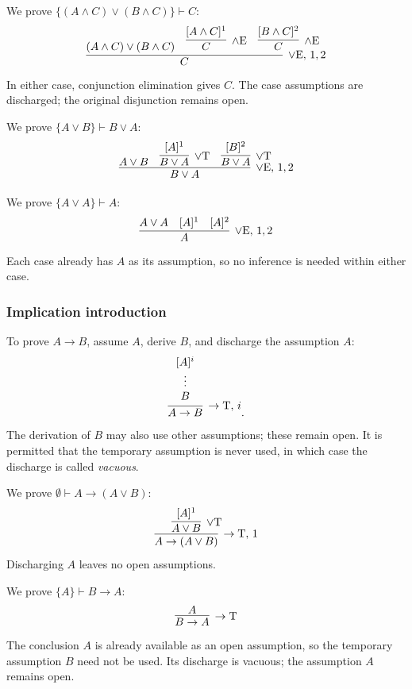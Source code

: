 \documentclass[11pt,a4paper]{amsart}
\begin{document}
\begin{example}
  We prove \(\{(A\land C)\lor(B\land C)\}\vdash C\):
  \[
    \infer[\lor\mathrm E,\,1,2]{C}{
      (A\land C)\lor(B\land C)
      & \infer[\land\mathrm E]{C}{[A\land C]^1}
    & \infer[\land\mathrm E]{C}{[B\land C]^2}}
  \]
  In either case, conjunction elimination gives \(C\). The case
  assumptions are discharged; the original disjunction remains open.
\end{example}

\begin{example}
  We prove \(\{A\lor B\}\vdash B\lor A\):
  \[
    \infer[\lor\mathrm E,\,1,2]{B\lor A}{
      A\lor B
      & \infer[\lor\mathrm T]{B\lor A}{[A]^1}
    & \infer[\lor\mathrm T]{B\lor A}{[B]^2}}
  \]
\end{example}

\begin{example}
  We prove \(\{A\lor A\}\vdash A\):
  \[
    \infer[\lor\mathrm E,\,1,2]{A}{A\lor A & [A]^1 & [A]^2}
  \]
  Each case already has \(A\) as its assumption, so no inference is needed
  within either case.
\end{example}

\subsubsection{Implication introduction}

To prove \(A\to B\), assume \(A\), derive \(B\), and discharge the
assumption \(A\):
\[
  \infer[\to\mathrm T,\,i]{A\to B}{
    \begin{array}{c}[A]^i\\\vdots\\B
  \end{array}}.
\]
The derivation of \(B\) may also use other assumptions; these remain open.
It is permitted that the temporary assumption is never used, in which
case the discharge is called \emph{vacuous}.

\begin{example}
  We prove \(\emptyset\vdash A\to(A\lor B)\):
  \[
    \infer[\to\mathrm T,\,1]{A\to(A\lor B)}{
    \infer[\lor\mathrm T]{A\lor B}{[A]^1}}
  \]
  Discharging \(A\) leaves no open assumptions.
\end{example}

\begin{example}
  We prove \(\{A\}\vdash B\to A\):
  \[
    \infer[\to\mathrm T]{B\to A}{A}
  \]
  The conclusion \(A\) is already available as an open assumption, so the
  temporary assumption \(B\) need not be used. Its discharge is vacuous;
  the assumption \(A\) remains open.
\end{example}
\end{document}
